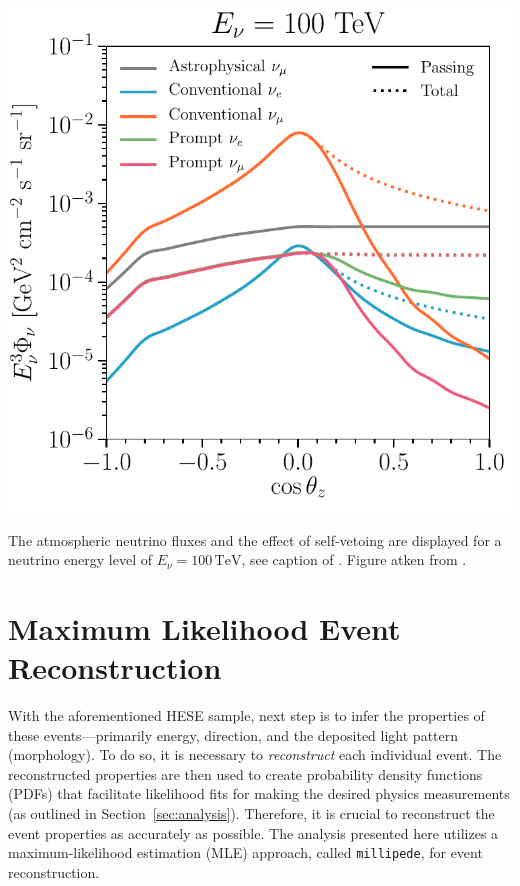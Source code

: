 \begin{marginfigure}
	\includegraphics{./figures/EventSample/fig1_fluxes_100.pdf}
	\caption[The atmospheric neutrino fluxes and the effect of self-vetoing are displayed for a neutrino energy level of \( E_\nu = 100 \, \text{TeV} \)]{The atmospheric neutrino fluxes and the effect of self-vetoing are displayed for a neutrino energy level of \( E_\nu = 100 \, \text{TeV} \), see caption of . Figure atken from \cite{pass_frac}.}
\end{marginfigure}

\section{Maximum Likelihood Event Reconstruction}
\label{sec:reco}
With the aforementioned HESE sample, next step is to infer the properties of these events—primarily energy, direction, and the deposited light pattern (morphology). To do so, it is necessary to \emph{reconstruct} each individual event. The reconstructed properties are then used to create probability density functions (PDFs) that facilitate likelihood fits for making the desired physics measurements (as outlined in Section~\ref{sec:analysis}). Therefore, it is crucial to reconstruct the event properties as accurately as possible. The analysis presented here utilizes a maximum-likelihood estimation (MLE) approach, called \texttt{millipede}, for event reconstruction. 

